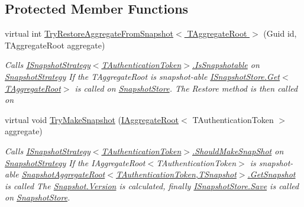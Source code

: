 \subsection*{Protected Member Functions}
\begin{DoxyCompactItemize}
\item 
virtual int \hyperlink{classCqrs_1_1Snapshots_1_1SnapshotRepository_a1328c103474b2b394b7af61a24455a65_a1328c103474b2b394b7af61a24455a65}{Try\+Restore\+Aggregate\+From\+Snapshot$<$ T\+Aggregate\+Root $>$} (Guid id, T\+Aggregate\+Root aggregate)
\begin{DoxyCompactList}\small\item\em Calls \hyperlink{interfaceCqrs_1_1Snapshots_1_1ISnapshotStrategy_a02121821312c4ce2811b31eeaffabe51_a02121821312c4ce2811b31eeaffabe51}{I\+Snapshot\+Strategy$<$\+T\+Authentication\+Token$>$.\+Is\+Snapshotable} on \hyperlink{classCqrs_1_1Snapshots_1_1SnapshotRepository_a7d65b4df10d0b6f75c911a9b6d59b3ba_a7d65b4df10d0b6f75c911a9b6d59b3ba}{Snapshot\+Strategy} If the {\itshape T\+Aggregate\+Root}  is snapshot-\/able \hyperlink{interfaceCqrs_1_1Snapshots_1_1ISnapshotStore_ab7bd163fc9cd5c3bd5911679030be403_ab7bd163fc9cd5c3bd5911679030be403}{I\+Snapshot\+Store.\+Get$<$\+T\+Aggregate\+Root$>$} is called on \hyperlink{classCqrs_1_1Snapshots_1_1SnapshotRepository_aba01e9f20eb41e6f3e4476a7f3182275_aba01e9f20eb41e6f3e4476a7f3182275}{Snapshot\+Store}. The Restore method is then called on \end{DoxyCompactList}\item 
virtual void \hyperlink{classCqrs_1_1Snapshots_1_1SnapshotRepository_a06b3211ded753ed79c3080819b16d496_a06b3211ded753ed79c3080819b16d496}{Try\+Make\+Snapshot} (\hyperlink{interfaceCqrs_1_1Domain_1_1IAggregateRoot}{I\+Aggregate\+Root}$<$ T\+Authentication\+Token $>$ aggregate)
\begin{DoxyCompactList}\small\item\em Calls \hyperlink{interfaceCqrs_1_1Snapshots_1_1ISnapshotStrategy_ab1d54cd76c7ac832329cb3a6de0effcd_ab1d54cd76c7ac832329cb3a6de0effcd}{I\+Snapshot\+Strategy$<$\+T\+Authentication\+Token$>$.\+Should\+Make\+Snap\+Shot} on \hyperlink{classCqrs_1_1Snapshots_1_1SnapshotRepository_a7d65b4df10d0b6f75c911a9b6d59b3ba_a7d65b4df10d0b6f75c911a9b6d59b3ba}{Snapshot\+Strategy} If the I\+Aggregate\+Root$<$\+T\+Authentication\+Token$>$ is snapshot-\/able \hyperlink{classCqrs_1_1Snapshots_1_1SnapshotAggregateRoot_a30ec8fe3a09fec8238c5921c629a5ac1_a30ec8fe3a09fec8238c5921c629a5ac1}{Snapshot\+Aggregate\+Root$<$\+T\+Authentication\+Token,\+T\+Snapshot$>$.\+Get\+Snapshot} is called The \hyperlink{classCqrs_1_1Snapshots_1_1Snapshot_a59c0a399430e5f4a1b27d999c3bb5d4f_a59c0a399430e5f4a1b27d999c3bb5d4f}{Snapshot.\+Version} is calculated, finally \hyperlink{interfaceCqrs_1_1Snapshots_1_1ISnapshotStore_a6e99c620115ce8a0648a83bf2ce05527_a6e99c620115ce8a0648a83bf2ce05527}{I\+Snapshot\+Store.\+Save} is called on \hyperlink{classCqrs_1_1Snapshots_1_1SnapshotRepository_aba01e9f20eb41e6f3e4476a7f3182275_aba01e9f20eb41e6f3e4476a7f3182275}{Snapshot\+Store}. \end{DoxyCompactList}\end{DoxyCompactItemize}
